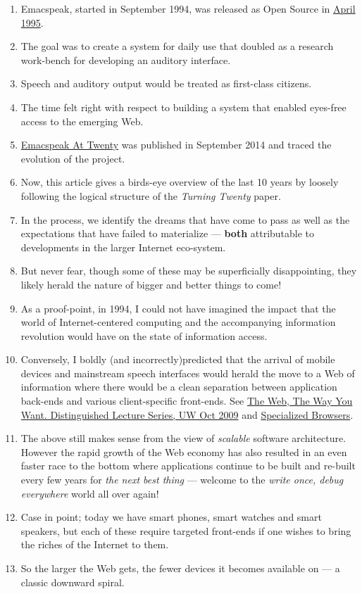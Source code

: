 \documentclass[11pt]{article}
\begin{document}
\begin{enumerate}
\item Emacspeak, started in September 1994, was released as Open
Source in \href{https://tvraman.github.io/emacspeak//web/releases/release-3.0.html}{April 1995}.
\item The goal was to create a system for daily use that  doubled
as a research work-bench for developing an auditory interface.
\item Speech and auditory output would be  treated as 
first-class citizens.
\item The time felt right with respect to building a  system 
that enabled  eyes-free access to the emerging Web.
\item \href{https://emacspeak.sourceforge.net/turning-twenty.html}{Emacspeak At Twenty}  was published in September 2014 and  traced the
evolution of the project.
\item Now, this article gives a birds-eye overview of the last 10 years
by loosely following the logical structure of the  \emph{Turning Twenty} paper.
\item In the process, we identify the dreams that have come to pass as
well as the expectations that have failed to materialize --- \textbf{both}
attributable  to developments in the larger Internet eco-system.
\item But never fear, though  some of these
may be   superficially
disappointing, they likely herald the nature of bigger and better
things to come!
\item As a proof-point, in 1994, I could not have imagined the impact
that the world of Internet-centered  computing and the accompanying
information revolution would have  on the state of information
access.
\item Conversely, I boldly  (and incorrectly)predicted  that the arrival of mobile
devices and mainstream speech interfaces would herald the move to
a Web of information where there would be a clean separation
between application back-ends and various client-specific
front-ends. See \href{http://www.cs.washington.edu/htbin-post/mvis/mvis?ID=636}{The Web, The Way You Want.  Distinguished Lecture
Series, UW Oct 2009} and \href{https://emacspeak.sourceforge.net/raman/publications/specialized-browsers/}{Specialized Browsers}.
\item The above still makes sense from the view of  \emph{scalable} software architecture. However the rapid growth of the Web economy has also
resulted in an even faster race to the bottom where applications
continue to be built and re-built every few years for \emph{the next
best thing} --- welcome to the \emph{write once, debug everywhere}
world all over again!
\item Case in point; today we have smart phones, smart watches  and smart speakers,
but each of these  require targeted front-ends  
if one wishes to  bring the riches of the Internet to them.
\item So the larger the Web gets, the fewer devices it becomes
available  on --- a classic downward spiral.
\end{enumerate}
\end{document}
